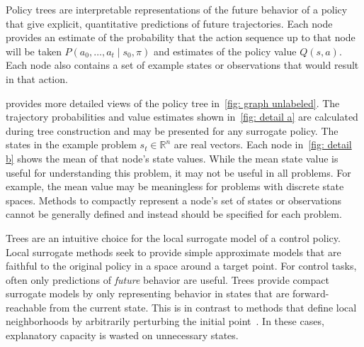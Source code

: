 \documentclass[letterpaper]{article} %
\begin{document}
Policy trees are interpretable representations of the future behavior of a policy that give explicit, quantitative predictions of future trajectories.
Each node provides an estimate of the probability that the action sequence up to that node will be taken $P(a_0, \dots, a_t \mid s_0, \pi)$ and estimates of the policy value $Q(s, a)$.
Each node also contains a set of example states or observations that would result in that action.

 provides more detailed views of the policy tree in~\cref{fig: graph unlabeled}.
The trajectory probabilities and value estimates shown in~\cref{fig: detail a} are calculated during tree construction and may be presented for any surrogate policy.
The states in the example problem $s_t \in \mathbb{R}^{n}$ are real vectors.
Each node in~\cref{fig: detail b} shows the mean of that node's state values.
While the mean state value is useful for understanding this problem, it may not be useful in all problems.
For example, the mean value may be meaningless for problems with discrete state spaces.
Methods to compactly represent a node's set of states or observations cannot be generally defined and instead should be specified for each problem.

Trees are an intuitive choice for the local surrogate model of a control policy.
Local surrogate methods seek to provide simple approximate models that are faithful to the original policy in a space around a target point.
For control tasks, often only predictions of \emph{future} behavior are useful.
Trees provide compact surrogate models by only representing behavior in states that are forward-reachable from the current state.
This is in contrast to methods that define local neighborhoods by arbitrarily perturbing the initial point~\cite{ribeiro2016}.
In these cases, explanatory capacity is wasted on unnecessary states.
\end{document}
